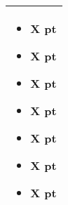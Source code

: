 \begin{tabular}{||m{532pt}||}
\begin{itemize}
		\item \quickref{Sentient Singularity} \hrulefill X pt
		\item \quickref{Seismic Assault} \hrulefill X pt
		\item \quickref{Sky of Falling Stars} \hrulefill X pt
		\item \quickref{Swarm of Spirit Dust} \hrulefill X pt
		\item \quickref{Time's Arrow} \hrulefill X pt
		\item \quickref{Transdimensional Thunderbolt} \hrulefill X pt
		\item \quickref{Withering Worldscape} \hrulefill X pt
	\end{itemize} \\
	\hline
\end{tabular}



